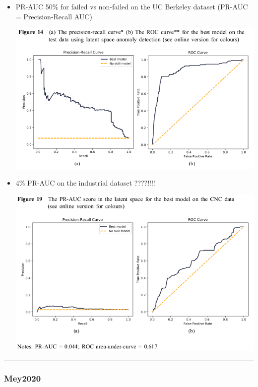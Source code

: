 \documentclass[
  letterpaper,
  DIV=11,
  numbers=noendperiod]{scrartcl}
\begin{document}
\begin{itemize}
  \begin{itemize}
  \item
    PR-AUC 50\% for failed vs non-failed on the UC Berkeley dataset
    (PR-AUC = Precision-Recall AUC)

    \includegraphics{img/2023-01-12-11-44-23.png}
  \item
    4\% PR-AUC on the industrial dataset ????!!!!

    \includegraphics{img/2023-01-12-11-45-14.png}
  \end{itemize}
\end{itemize}

\begin{center}\rule{0.5\linewidth}{0.5pt}\end{center}

\hypertarget{mey2020}{%
\subsubsection{Mey2020}\label{mey2020}}
\end{document}
